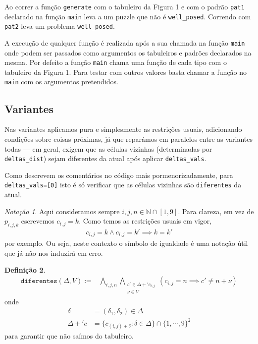 \documentclass[a4paper,12pt]{article}
\theoremstyle{definition}
\newtheorem{defn}{Definição}[section]
\theoremstyle{theorem}
\theoremstyle{remark}
\newtheorem{notç}[defn]{Notação}
\newcommand{\code}[1]{\texttt{#1}}
\begin{document}
Ao correr a função \code{generate} com o tabuleiro da Figura 1 e com o padrão \code{pat1} declarado na função \code{main} leva a um
puzzle que não é \code{well\_posed}. Correndo com \code{pat2} leva um problema
\code{well\_posed}.

A execução de qualquer função é realizada após a sua chamada na função
\code{main} onde podem ser passados como argumentos os tabuleiros e padrões
declarados na mesma. Por defeito a função \code{main} chama uma função de cada
tipo com o tabuleiro da Figura 1. Para testar com outros
valores basta chamar a função no \code{main} com os argumentos pretendidos.






\subsection{Variantes}
Nas variantes aplicamos pura e simplesmente as restrições usuais,
adicionando condições sobre coisas próximas, já que reparámos em
paralelos entre as variantes todas \---- em geral, exigem que
as células vizinhas (determinadas por \code{deltas\_dist})
sejam diferentes da atual após aplicar \code{deltas\_vals}.

Como
descrevem os comentários no código mais pormenorizadamente, para
\code{deltas\_vals=[0]} isto é só verificar que as células vizinhas
são \code{diferentes} da atual.

\begin{notç}
   Aqui consideramos sempre $i,j,n\in\mathbb N\cap[1,9]$.
   Para clareza, em vez de $p_{i,j,k}$ escrevemos $c_{i,j}=k$. Como temos
   as restrições usuais em vigor,
   \begin{align}
      c_{i,j}=k\land c_{i,j}=k' \implies k = k'
   \end{align}
   por exemplo. Ou seja, neste contexto o símbolo de igualdade é uma notação
   útil que já não nos
   induzirá em erro.
\end{notç}

\begin{defn}
\begin{align}
   \mathtt{diferentes}(\Delta, V) :=%
   &\bigwedge_{i,j,n}
   \bigwedge_{\substack{c'\in\Delta+'c_{i,j}\\\nu\in V}}
   (c_{i,j} = n
      \implies
   c' \neq n + \nu)
\end{align}
onde
\begin{align}
   \delta &= (\delta_1,\delta_2)\in \Delta\\
   \Delta+'c &= \{c_{(i,j)+\delta}:\delta\in\Delta\}\cap\{1,\cdots,9\}^2
\end{align}
para garantir que não saímos do tabuleiro.
\end{defn}
\end{document}
